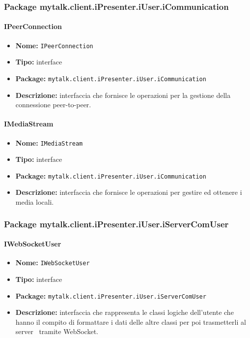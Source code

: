 \subsubsection{Package mytalk.client.iPresenter.iUser.iCommunication}

\paragraph{IPeerConnection}{
	\begin{itemize}
		\item [] \textbf{Nome:} \texttt{IPeerConnection}
		\item [] \textbf{Tipo:} interface
		\item [] \textbf{Package:} \texttt{mytalk.client.iPresenter.iUser.iCommunication}
		\item [] \textbf{Descrizione:}{ interfaccia che fornisce le operazioni per la gestione della connessione peer-to-peer.}
	\end{itemize}
}
	
\paragraph{IMediaStream}{
	\begin{itemize}
		\item [] \textbf{Nome:} \texttt{IMediaStream}
		\item [] \textbf{Tipo:} interface
		\item [] \textbf{Package:} \texttt{mytalk.client.iPresenter.iUser.iCommunication}
		\item [] \textbf{Descrizione:}{ interfaccia che fornisce le operazioni per gestire ed ottenere i media locali.}
	\end{itemize}
}

\subsubsection{Package mytalk.client.iPresenter.iUser.iServerComUser}
\paragraph{IWebSocketUser}{
	\begin{itemize}
		\item [] \textbf{Nome:} \texttt{IWebSocketUser}
		\item [] \textbf{Tipo:} interface
		\item [] \textbf{Package:} \texttt{mytalk.client.iPresenter.iUser.iServerComUser}
		\item [] \textbf{Descrizione:}{ interfaccia che rappresenta le classi logiche dell'utente che hanno il compito di formattare i dati delle altre classi per poi trasmetterli al server\g~ tramite WebSocket\g.}
	\end{itemize}
}
\newpage

